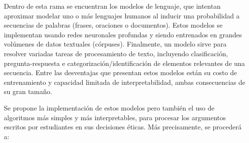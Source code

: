 \documentclass[
	spanish, %
	letterpaper, oneside
]{article}
\begin{document}
\newp Dentro de esta rama se encuentran los modelos de lenguaje, que intentan aproximar modelar uno o más lenguajes humanos al inducir una probabilidad a secuencias de palabras (frases, oraciones o documentos). Estos modelos se implementan usando redes neuronales profundas y siendo entrenados en grandes volúmenes de datos textuales (córpuses). Finalmente, un modelo sirve para resolver variadas tareas de procesamiento de texto, incluyendo clasificación, pregunta-respuesta e categorización/identificación de elementos relevantes de una secuencia. Entre las desventajas que presentan estos modelos están su costo de entrenamiento y capacidad limitada de interpretabilidad, ambas consecuencias de su gran tamaño.

\newp Se propone la implementación de estos modelos pero también el uso de algoritmos más simples y más interpretables, para procesar los argumentos escritos por estudiantes en sus decisiones éticas. Más precisamente, se procederá a:
\end{document}
